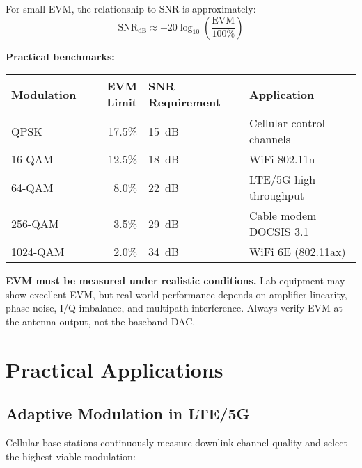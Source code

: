 For small EVM, the relationship to SNR is approximately:
\begin{equation}
\mathrm{SNR}_{\text{dB}} \approx -20\log_{10}\left(\frac{\mathrm{EVM}}{100\%}\right)
\end{equation}

\textbf{Practical benchmarks:}

\begin{center}
\begin{tabular}{@{}lrll@{}}
\toprule
Modulation & EVM Limit & SNR Requirement & Application \\
\midrule
QPSK & 17.5\% & 15~dB & Cellular control channels \\
16-QAM & 12.5\% & 18~dB & WiFi 802.11n \\
64-QAM & 8.0\% & 22~dB & LTE/5G high throughput \\
256-QAM & 3.5\% & 29~dB & Cable modem DOCSIS 3.1 \\
1024-QAM & 2.0\% & 34~dB & WiFi 6E (802.11ax) \\
\bottomrule
\end{tabular}
\end{center}

\begin{warningbox}
\textbf{EVM must be measured under realistic conditions.} Lab equipment may show excellent EVM, but real-world performance depends on amplifier linearity, phase noise, I/Q imbalance, and multipath interference. Always verify EVM at the antenna output, not the baseband DAC.
\end{warningbox}

\section{Practical Applications}

\subsection{Adaptive Modulation in LTE/5G}

Cellular base stations continuously measure downlink channel quality and select the highest viable modulation:

